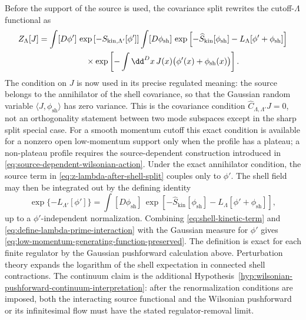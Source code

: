 Before the support of the source is used, the covariance split rewrites the
cutoff-\(\Lambda\) functional as
\begin{align}
  Z_\Lambda[J]
  &=
  \int[D\phi']\,
  \exp\left[
    -S_{\mathrm{kin},\Lambda'}[\phi']
  \right]
  \int[D\phi_{\mathrm{sh}}]\,
  \exp\left[
    -\widehat S_{\mathrm{kin}}[\phi_{\mathrm{sh}}]
    -L_\Lambda[\phi'+\phi_{\mathrm{sh}}]
  \right]
  \notag\\
  &\hspace{2.0cm}\times
  \exp\left[
    -\int\dd^Dx\,J(x)\bigl(\phi'(x)+\phi_{\mathrm{sh}}(x)\bigr)
  \right].
  \label{eq:z-lambda-after-shell-split}
\end{align}
The condition on \(J\) is now used in its precise regulated meaning: the source
belongs to the annihilator of the shell covariance, so that the Gaussian
random variable \(\langle J,\phi_{\mathrm{sh}}\rangle\) has zero variance.
This is the covariance condition
\(\widehat C_{\Lambda,\Lambda'}J=0\), not an orthogonality statement between
two mode subspaces except in the sharp split special case.  For a smooth
momentum cutoff this exact condition is available for a nonzero open
low-momentum support only when the profile has a plateau; a non-plateau
profile requires the source-dependent construction introduced in
\eqref{eq:source-dependent-wilsonian-action}.  Under the exact annihilator
condition, the source term in
\eqref{eq:z-lambda-after-shell-split} couples only to \(\phi'\).  The shell
field may then be integrated out by the defining identity
\begin{equation}
  \exp\{-L_{\Lambda'}[\phi']\}
  =
  \int[D\phi_{\mathrm{sh}}]\,
  \exp\left[
    -\widehat S_{\mathrm{kin}}[\phi_{\mathrm{sh}}]
    -L_\Lambda[\phi'+\phi_{\mathrm{sh}}]
  \right],
  \label{eq:define-lambda-prime-interaction}
\end{equation}
up to a \(\phi'\)-independent normalization.  Combining
\eqref{eq:shell-kinetic-term} and
\eqref{eq:define-lambda-prime-interaction} with the Gaussian measure for
\(\phi'\) gives \eqref{eq:low-momentum-generating-function-preserved}.  The
definition is exact for each finite regulator by the Gaussian pushforward
calculation above.  Perturbation
theory expands the logarithm of the shell expectation in connected shell
contractions.  The continuum claim is the additional
Hypothesis~\ref{hyp:wilsonian-pushforward-continuum-interpretation}: after the
renormalization conditions are imposed, both the interacting source functional
and the Wilsonian pushforward or its infinitesimal flow must have the stated
regulator-removal limit.

